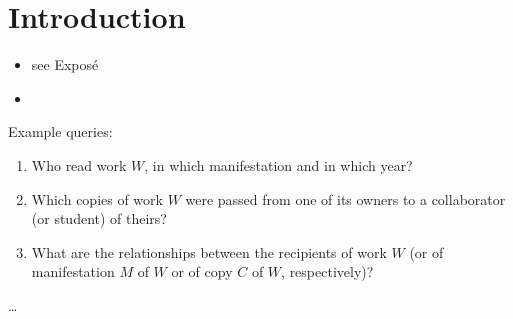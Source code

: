 
\chapter{Introduction}
\label{chap:intro}

\begin{itemize}
  \item
    see Exposé
  \item
\end{itemize}

Example queries:
%
\begin{enumerate}
  \item[\exaquery{1}]
    Who read work $W$, in which manifestation and in which year?
  \item[\exaquery{2}]
    Which copies of work $W$ were passed from one of its owners to a collaborator (or student) of theirs?
  \item[\exaquery{3}]
    What are the relationships between the recipients of work $W$
    (or of manifestation $M$ of $W$ or of copy $C$ of $W$, respectively)?
\end{enumerate}


\dots

